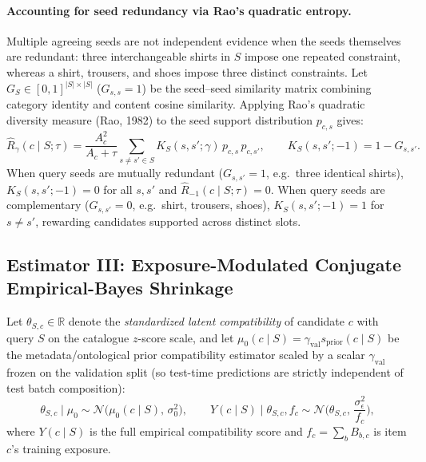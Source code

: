 \paragraph{Accounting for seed redundancy via Rao's quadratic entropy.}
Multiple agreeing seeds are not independent evidence when the seeds themselves are redundant: three
interchangeable shirts in $S$ impose one repeated constraint, whereas a shirt, trousers, and shoes impose three
distinct constraints. Let $G_S \in [0,1]^{|S|\times|S|}$ ($G_{s,s}=1$) be the seed--seed similarity matrix
combining category identity and content cosine similarity. Applying Rao's quadratic diversity measure (Rao, 1982)
to the seed support distribution $p_{c,s}$ gives:
\begin{equation}
  \hat{R}_{\gamma}(c\mid S;\tau)
  = \frac{A_c^2}{A_c + \tau} \sum_{s\neq s'\in S} K_S(s,s';\gamma)\,p_{c,s}\,p_{c,s'},
  \qquad K_S(s,s';-1) = 1 - G_{s,s'}.
  \label{eq:rao}
\end{equation}
When query seeds are mutually redundant ($G_{s,s'}=1$, e.g.\ three identical shirts), $K_S(s,s';-1) = 0$ for all
$s,s'$ and $\hat{R}_{-1}(c\mid S;\tau) = 0$. When query seeds are complementary ($G_{s,s'}=0$, e.g.\ shirt,
trousers, shoes), $K_S(s,s';-1)=1$ for $s\neq s'$, rewarding candidates supported across distinct slots.

\subsection{Estimator III: Exposure-Modulated Conjugate Empirical-Bayes Shrinkage}
\label{sec:eb}
Let $\theta_{S,c} \in \mathbb{R}$ denote the \emph{standardized latent compatibility} of candidate $c$ with query
$S$ on the catalogue $z$-score scale, and let $\mu_0(c\mid S) = \gamma_{\text{val}} s_{\text{prior}}(c\mid S)$ be
the metadata/ontological prior compatibility estimator scaled by a scalar $\gamma_{\text{val}}$ frozen on the
validation split (so test-time predictions are strictly independent of test batch composition):
\begin{equation}
  \theta_{S,c}\mid\mu_0 \sim \mathcal{N}\!\big(\mu_0(c\mid S),\,\sigma_0^2\big),
  \qquad
  Y(c\mid S)\mid\theta_{S,c}, f_c
  \sim \mathcal{N}\!\Big(\theta_{S,c},\,\frac{\sigma_\epsilon^2}{f_c}\Big),
  \label{eq:obs}
\end{equation}
where $Y(c\mid S)$ is the full empirical compatibility score and $f_c = \sum_b B_{b,c}$ is item $c$'s training
exposure.

